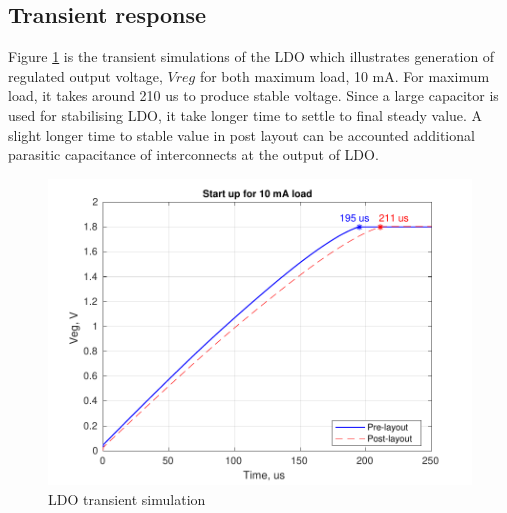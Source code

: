 \documentclass[12pt,a4paper,UKenglish]{report}
\begin{document}
\subsection{Transient response}	%

Figure \ref{fig:ldo_tran} is the transient simulations of the LDO which illustrates generation of  regulated output voltage, $Vreg$ for 
both maximum load, 10 mA. For maximum load, it takes around 210 us to produce stable voltage. Since a large capacitor is used for stabilising LDO, it take longer time to settle to final steady value. A slight longer time to stable value in post layout can be accounted additional parasitic capacitance of interconnects at the output of LDO.\\

\begin{figure}[!htb] %
   \centering
   \includegraphics[width=1\textwidth]{img/ldo_transient_both.pdf} 
   \caption{LDO transient simulation}
   \label{fig:ldo_tran}
\end{figure}
\end{document}
